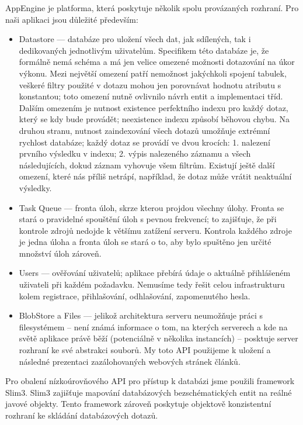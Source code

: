 AppEngine je platforma, která poskytuje několik spolu provázaných rozhraní.
Pro naši aplikaci jsou důležité především:
\begin{itemize}
	\item Datastore --- databáze pro uložení všech dat, jak sdílených, tak i dedikovaných jednotlivým uživatelům.
		Specifikem této databáze je, že formálně nemá schéma a má jen velice omezené možnosti dotazování na úkor výkonu.
		Mezi největší omezení patří nemožnost jakýchkoli spojení tabulek, veškeré filtry použité v dotazu mohou jen porovnávat hodnotu atributu s konstantou; toto omezení nutně ovlivnilo návrh entit a implementaci tříd.
		Dalším omezením je nutnost existence perfektního indexu pro každý dotaz, který se kdy bude provádět; neexistence indexu způsobí běhovou chybu.
		Na druhou stranu, nutnost zaindexování všech dotazů umožňuje extrémní rychlost databáze; každý dotaz se provádí ve dvou krocích:
		1. nalezení prvního výsledku v indexu; 2. výpis nalezeného záznamu a všech následujících, dokud záznam vyhovuje všem filtrům.
		Existují ještě další omezení, které nás příliš netrápí, například, že dotaz může vrátit neaktuální výsledky.
	\item Task Queue --- fronta úloh, skrze kterou projdou všechny úlohy.
		Fronta se stará o pravidelné spouštění úloh s pevnou frekvencí; to zajišťuje, že při kontrole zdrojů nedojde k většímu zatížení serveru.
		Kontrola každého zdroje je jedna úloha a fronta úloh se stará o to, aby bylo spuštěno jen určité množství úloh zároveň.
	\item Users --- ověřování uživatelů; aplikace přebírá údaje o aktuálně přihlášeném uživateli při každém požadavku.
		Nemusíme tedy řešit celou infrastrukturu kolem registrace, přihlašování, odhlašování, zapomenutého hesla.
	\item BlobStore a Files --- jelikož architektura serveru neumožňuje práci s filesystémem -- není známá informace o tom, na kterých serverech a kde na světě aplikace právě běží (potenciálně v několika instancích) -- posktuje server rozhraní ke své abstrakci souborů.
		My toto API použijeme k uložení a následné prezentaci zazálohovaných webových stránek článků.
\end{itemize}

Pro obalení nízkoúrovňového API pro přístup k databázi jsme použili framework Slim3.
Slim3 zajišťuje mapování databázových bezschématických entit na reálné javové objekty.
Tento framework zároveň poskytuje objektově konzistentní rozhraní ke skládání databázových dotazů.

